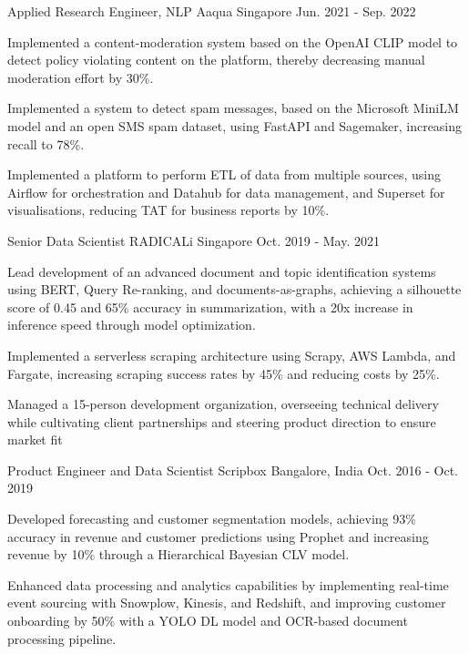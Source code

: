 \begin{cventries}
  \cventry
    {Applied Research Engineer, NLP} %
    {Aaqua} %
    {Singapore} %
    {Jun. 2021  - Sep. 2022} %
    {
      \begin{cvitems} %
        \item {Implemented a content-moderation system based on the OpenAI CLIP model to detect policy violating content on the platform, thereby decreasing manual moderation effort by 30\%. }
        \item {Implemented a system to detect spam messages, based on the Microsoft MiniLM model and an open SMS spam dataset, using FastAPI and Sagemaker, increasing recall to 78\%.}
        \item {Implemented a platform to perform ETL of data from multiple sources, using Airflow for orchestration and Datahub for data management, and Superset for visualisations, reducing TAT for business reports by 10\%.}
      \end{cvitems}
    }

  \cventry
    {Senior Data Scientist} %
    {RADICALi} %
    {Singapore} %
    {Oct. 2019 - May. 2021} %
    {
      \begin{cvitems} %
        \item {Lead development of an advanced document and topic identification systems using BERT, Query Re-ranking, and documents-as-graphs, achieving a silhouette score of 0.45 and 65\% accuracy in summarization, with a 20x increase in inference speed through model optimization.}
        \item{Implemented a serverless scraping architecture using Scrapy, AWS Lambda, and Fargate, increasing scraping success rates by 45\% and reducing costs by 25\%.}
        \item{Managed a 15-person development organization, overseeing technical delivery while cultivating client partnerships and steering product direction to ensure market fit}
      \end{cvitems}
    }

  \cventry
    {Product Engineer and Data Scientist} %
    {Scripbox} %
    {Bangalore, India} %
    {Oct. 2016 - Oct. 2019} %
    {
      \begin{cvitems} %
        \item {Developed forecasting and customer segmentation models, achieving 93\% accuracy in revenue and customer predictions using Prophet and increasing revenue by 10\% through a Hierarchical Bayesian CLV model.}
        \item{Enhanced data processing and analytics capabilities by implementing real-time event sourcing with Snowplow, Kinesis, and Redshift, and improving customer onboarding by 50\% with a YOLO DL model and OCR-based document processing pipeline.}
      \end{cvitems}
    }


\end{cventries}
